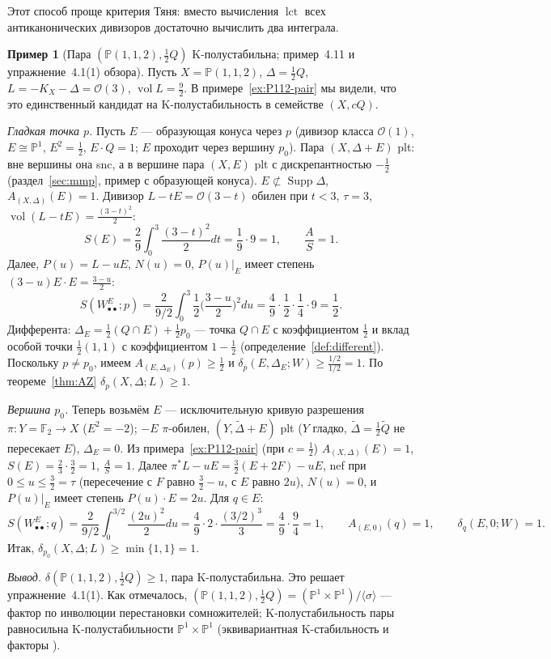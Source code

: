 \documentclass[11pt,a4paper]{article}
\theoremstyle{plain}
\theoremstyle{definition}
\newtheorem{example}[theorem]{Пример}
\theoremstyle{remark}
\newcommand{\PP}{\mathbb{P}}
\newcommand{\cO}{\mathcal{O}}
\DeclareMathOperator{\vol}{vol}
\DeclareMathOperator{\lct}{lct}
\DeclareMathOperator{\Supp}{Supp}
\begin{document}
Этот способ проще критерия Тяня: вместо вычисления $\lct$ всех антиканонических дивизоров
достаточно вычислить два интеграла.

\begin{example}[Пара $(\PP(1,1,2),\frac12Q)$ K-полустабильна; пример~4.11 и упражнение~4.1(1) обзора]\label{ex:AZ-P112}
Пусть $X=\PP(1,1,2)$, $\Delta=\frac12Q$, $L=-K_X-\Delta=\cO(3)$, $\vol L=\frac92$. В
примере~\ref{ex:P112-pair} мы видели, что это единственный кандидат на K-полустабильность в семействе
$(X,cQ)$.

\emph{Гладкая точка $p$.} Пусть $E$ --- образующая конуса через $p$ (дивизор класса $\cO(1)$,
$E\cong\PP^1$, $E^2=\frac12$, $E\cdot Q=1$; $E$ проходит через вершину $p_0$). Пара
$(X,\Delta+E)$ plt: вне вершины она snc, а в вершине пара $(X,E)$ plt с дискрепантностью
$-\frac12$ (раздел~\ref{sec:mmp}, пример с образующей конуса). $E\not\subset\Supp\Delta$,
$A_{(X,\Delta)}(E)=1$. Дивизор $L-tE=\cO(3-t)$ обилен при
$t<3$, $\tau=3$, $\vol(L-tE)=\frac{(3-t)^2}2$:
\[
S(E)=\frac29\int_0^3\frac{(3-t)^2}2dt=\frac19\cdot9=1,\qquad\frac{A}{S}=1 .
\]
Далее, $P(u)=L-uE$, $N(u)=0$, $P(u)|_E$ имеет степень $(3-u)E\cdot E=\frac{3-u}2$:
\[
S(W^E_{\bullet\bullet};p)=\frac2{9/2}\int_0^3\frac12\Big(\frac{3-u}2\Big)^2du=\frac49\cdot\frac12\cdot\frac14\cdot9=\frac12 .
\]
Дифферента: $\Delta_E=\frac12(Q\cap E)+\frac12p_0$ --- точка $Q\cap E$ с коэффициентом $\frac12$
и вклад особой точки $\frac12(1,1)$ с коэффициентом $1-\frac12$ (определение~\ref{def:different}).
Поскольку $p\ne p_0$, имеем $A_{(E,\Delta_E)}(p)\ge\frac12$ и $\delta_p(E,\Delta_E;W)\ge\frac{1/2}{1/2}=1$. По
теореме~\ref{thm:AZ} $\delta_p(X,\Delta;L)\ge1$.

\emph{Вершина $p_0$.} Теперь возьмём $E$ --- исключительную кривую разрешения
$\pi\colon Y=\mathbb F_2\to X$ ($E^2=-2$); $-E$ $\pi$-обилен, $(Y,\tilde\Delta+E)$ plt ($Y$ гладко,
$\tilde\Delta=\frac12\tilde Q$ не пересекает $E$), $\Delta_E=0$. Из примера~\ref{ex:P112-pair} (при
$c=\frac12$) $A_{(X,\Delta)}(E)=1$, $S(E)=\frac23\cdot\frac32=1$, $\frac AS=1$. Далее
$\pi^*L-uE=\frac32(E+2F)-uE$, nef при $0\le u\le\frac32=\tau$ (пересечение с $F$ равно $\frac32-u$,
с $E$ равно $2u$), $N(u)=0$, и $P(u)|_E$ имеет степень $P(u)\cdot E=2u$. Для $q\in E$:
\[
S(W^E_{\bullet\bullet};q)=\frac2{9/2}\int_0^{3/2}\frac{(2u)^2}2du=\frac49\cdot2\cdot\frac{(3/2)^3}3=\frac49\cdot\frac94=1,
\qquad A_{(E,0)}(q)=1,\qquad\delta_q(E,0;W)=1 .
\]
Итак, $\delta_{p_0}(X,\Delta;L)\ge\min\{1,1\}=1$.

\emph{Вывод.} $\delta(\PP(1,1,2),\tfrac12Q)\ge1$, пара K-полустабильна. Это решает упражнение~4.1(1).
Как отмечалось, $(\PP(1,1,2),\frac12Q)=(\PP^1\times\PP^1)/\langle\sigma\rangle$ --- фактор по
инволюции перестановки сомножителей; K-полустабильность пары равносильна K-полустабильности
$\PP^1\times\PP^1$ (эквивариантная K-стабильность и факторы \cite{LZ22}).
\end{example}
\end{document}
